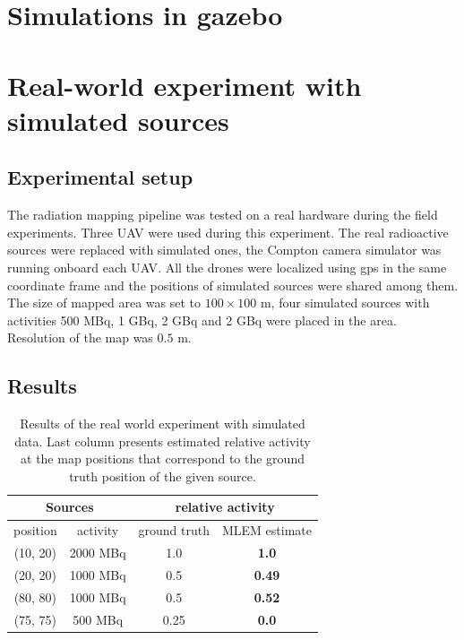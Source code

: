 {\section{Simulations in gazebo}

\section{Real-world experiment with simulated sources}

\subsection{Experimental setup}
The radiation mapping pipeline was tested on a real hardware during the field experiments.
Three \ac{UAV} were used during this experiment.
The real radioactive sources were replaced with simulated ones, the Compton camera simulator \cite{TODO} was running onboard each \ac{UAV}.
All the drones were localized using \ac{gps} in the same coordinate frame and the positions of simulated sources were shared among them.
The size of mapped area was set to $100 \times 100$ m, four simulated sources with activities 500 MBq, 1 GBq, 2 GBq and 2 GBq were placed in the area.
Resolution of the map was $0.5$ m.

\subsection{Results}
\begin{table}[htb]
\begin{center}
  \begin{tabular}{ |c|c|c|c| } 
 \hline
    \multicolumn{2}{|c}{Sources} &  \multicolumn{2}{|c|}{ relative activity } \\
 \hline
    position & activity & ground truth & MLEM estimate\\ 
 \hline
    (10, 20) & 2000 MBq & 1.0  & \textbf{1.0} \\ 
    (20, 20) & 1000 MBq &  0.5 & \textbf{0.49} \\ 
    (80, 80) & 1000 MBq &  0.5 & \textbf{0.52} \\ 
    (75, 75) & 500 MBq &  0.25 & \textbf{0.0} \\ 
 \hline
\end{tabular}
  \caption{Results of the real world experiment with simulated data. Last column presents estimated relative activity at the map positions that correspond to the ground truth position of the given source.}
  \label{tab:temenight_results}
\end{center}
\end{table}

}
